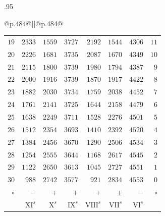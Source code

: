\begin{GaussVICeresFrame}{.95}
\begin{tabular}{@{}p{.484\linewidth}@{\hspace{2pt}}||@{\hspace{2pt}}p{.484\linewidth}@{}}
{\begin{tabular}{r@{\GaussVICeresRule}r|r|r|r|r|r@{\GaussVICeresRule}r}
$19$ & $2333$ & $1559$ & $3727$ & $2192$ & $1544$ & $4306$ & $11$ \\
$20$ & $2226$ & $1681$ & $3735$ & $2087$ & $1670$ & $4349$ & $10$ \\[3pt]
$21$ & $2115$ & $1800$ & $3739$ & $1980$ & $1794$ & $4387$ & $9$ \\
$22$ & $2000$ & $1916$ & $3739$ & $1870$ & $1917$ & $4422$ & $8$ \\
$23$ & $1882$ & $2030$ & $3734$ & $1759$ & $2038$ & $4452$ & $7$ \\
$24$ & $1761$ & $2141$ & $3725$ & $1644$ & $2158$ & $4479$ & $6$ \\
$25$ & $1638$ & $2249$ & $3711$ & $1528$ & $2276$ & $4501$ & $5$ \\[3pt]
$26$ & $1512$ & $2354$ & $3693$ & $1410$ & $2392$ & $4520$ & $4$ \\
$27$ & $1384$ & $2456$ & $3670$ & $1290$ & $2506$ & $4534$ & $3$ \\
$28$ & $1254$ & $2555$ & $3644$ & $1168$ & $2617$ & $4545$ & $2$ \\
$29$ & $1122$ & $2650$ & $3613$ & $1045$ & $2727$ & $4551$ & $1$ \\
$30$ & $988$ & $2742$ & $3577$ & $921$ & $2834$ & $4553$ & $0$ \\
\hline $\circ$ & $-$ & $\mp$ & $+$ & $+$ & $\pm$ & $-$ & $\circ$ \\
 & $\mathrm{XI}^s$ & $\mathrm{X}^s$ & $\mathrm{IX}^s$ & $\mathrm{VIII}^s$ & $\mathrm{VII}^s$ & $\mathrm{VI}^s$ & \\
\end{tabular}\par}
\tabularnewline
\end{tabular}\par
\end{GaussVICeresFrame}

